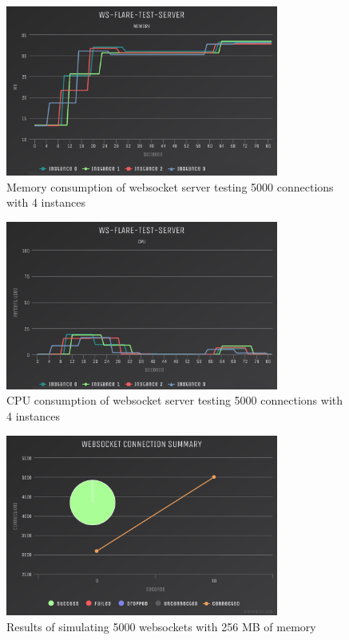 \begin{figure}[H]
  \centering
    \includegraphics[width=0.8\textwidth]{figures/experiments/experiment-1/node-js/memory-5000-4-instances.png}
    \caption{Memory consumption of websocket server testing 5000 connections with 4 instances}
    \label{fig:experiment-1-memory-5000-4-instances}
\end{figure}

\begin{figure}[H]
  \centering
    \includegraphics[width=0.8\textwidth]{figures/experiments/experiment-1/node-js/cpu-5000-4-instances.png}
    \caption{CPU consumption of websocket server testing 5000 connections with 4 instances}
    \label{fig:experiment-1-cpu-5000-4-instances}
\end{figure}

\begin{figure}[H]
  \centering
    \includegraphics[width=0.8\textwidth]{figures/experiments/experiment-1/node-js/conn-summary-5000-256-memory.png}
    \caption{Results of simulating 5000 websockets with 256 MB of memory}
    \label{fig:experiment-1-conn-summary-5000-1-instances-256-mem}
\end{figure}

